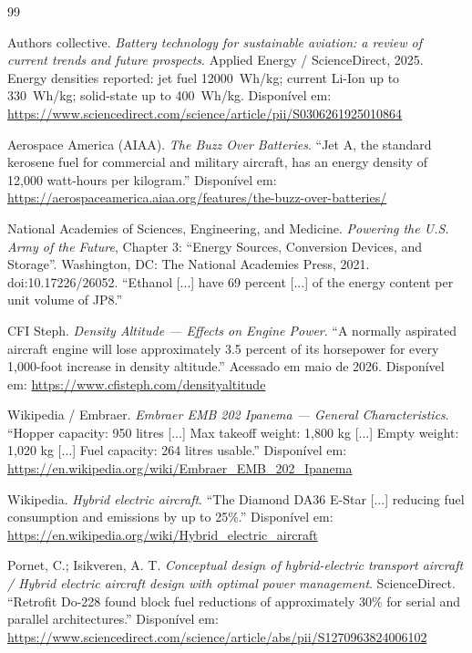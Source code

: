 \documentclass[a4paper,12pt]{article}
\begin{document}
\begin{thebibliography}{99}

    Authors collective. \textit{Battery technology for sustainable aviation: a review of current trends and future prospects}. Applied Energy / ScienceDirect, 2025. Energy densities reported: jet fuel \SI{12000}{Wh/kg}; current Li-Ion up to \SI{330}{Wh/kg}; solid-state up to \SI{400}{Wh/kg}. Disponível em: \url{https://www.sciencedirect.com/science/article/pii/S0306261925010864}

    Aerospace America (AIAA). \textit{The Buzz Over Batteries}. ``Jet A, the standard kerosene fuel for commercial and military aircraft, has an energy density of 12,000 watt-hours per kilogram.'' Disponível em: \url{https://aerospaceamerica.aiaa.org/features/the-buzz-over-batteries/}

    National Academies of Sciences, Engineering, and Medicine. \textit{Powering the U.S. Army of the Future}, Chapter 3: ``Energy Sources, Conversion Devices, and Storage''. Washington, DC: The National Academies Press, 2021. doi:10.17226/26052. ``Ethanol [...] have 69 percent [...] of the energy content per unit volume of JP8.''

    CFI Steph. \textit{Density Altitude --- Effects on Engine Power}. ``A normally aspirated aircraft engine will lose approximately 3.5 percent of its horsepower for every 1,000-foot increase in density altitude.'' Acessado em maio de 2026. Disponível em: \url{https://www.cfisteph.com/densityaltitude}

    Wikipedia / Embraer. \textit{Embraer EMB 202 Ipanema --- General Characteristics}. ``Hopper capacity: 950 litres [...] Max takeoff weight: 1,800 kg [...] Empty weight: 1,020 kg [...] Fuel capacity: 264 litres usable.'' Disponível em: \url{https://en.wikipedia.org/wiki/Embraer_EMB_202_Ipanema}

    Wikipedia. \textit{Hybrid electric aircraft}. ``The Diamond DA36 E-Star [...] reducing fuel consumption and emissions by up to 25\%.'' Disponível em: \url{https://en.wikipedia.org/wiki/Hybrid_electric_aircraft}

    Pornet, C.; Isikveren, A. T. \textit{Conceptual design of hybrid-electric transport aircraft / Hybrid electric aircraft design with optimal power management}. ScienceDirect. ``Retrofit Do-228 found block fuel reductions of approximately 30\% for serial and parallel architectures.'' Disponível em: \url{https://www.sciencedirect.com/science/article/abs/pii/S1270963824006102}


\end{thebibliography}
\end{document}

